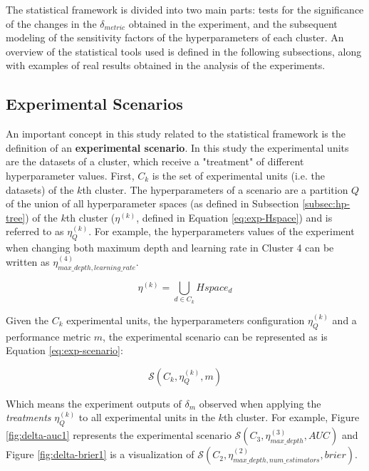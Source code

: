 The statistical framework is divided into two main parts: tests for the significance of the changes in the $\delta_{metric}$ obtained in the experiment, and the subsequent modeling of the sensitivity factors of the hyperparameters of each cluster. An overview of the statistical tools used is defined in the following subsections, along with examples of real results obtained in the analysis of the experiments.

\subsection{Experimental Scenarios}

An important concept in this study related to the statistical framework is the definition of an \textbf{experimental scenario}. In this study the experimental units are the datasets of a cluster, which receive a "treatment" of different hyperparameter values. First, $C_k$ is the set of experimental units (i.e. the datasets) of the $k$th cluster. The hyperparameters of a scenario are a partition $Q$ of the union of all hyperparameter spaces (as defined in Subsection \ref{subsec:hp-tree}) of the $k$th cluster ($\eta^{(k)}$, defined in Equation \ref{eq:exp-Hspace}) and is referred to as  $\eta^{(k)}_Q$. For example, the hyperparameters values of the experiment when changing both maximum depth and learning rate in Cluster 4 can be written as $\eta^{(4)}_{max\_depth, learning\_rate}$.

\begin{equation}
    \eta^{(k)} = \bigcup_{d \in C_k} Hspace_d
    \label{eq:exp-Hspace}
\end{equation}


\noindent Given the $C_k$ experimental units, the hyperparameters configuration  $\eta^{(k)}_Q$ and a performance metric $m$, the experimental scenario can be represented as is Equation \ref{eq:exp-scenario}:

\begin{equation}
 \mathcal{S}(C_k, \eta^{(k)}_Q, m)
 \label{eq:exp-scenario}
\end{equation}

\noindent Which means the experiment outputs of $\delta_m$ observed when applying the \textit{treatments} $\eta^{(k)}_Q$ to all experimental units in the $k$th cluster. For example,  Figure  \ref{fig:delta-auc1} represents the experimental scenario $\mathcal{S}(C_3, \eta^{(3)}_{max\_depth}, AUC)$ and Figure  \ref{fig:delta-brier1} is a visualization of $\mathcal{S}(C_2, \eta^{(2)}_{max\_depth,num\_estimators}, brier)$.


